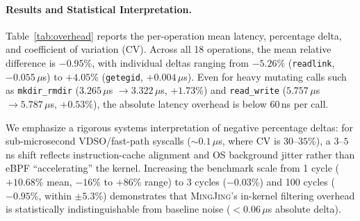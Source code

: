 \documentclass[10pt,twocolumn,letterpaper]{article}
\newcommand{\sys}{\textsc{MingJing}}
\newcommand{\code}[1]{\texttt{\small #1}}
\begin{document}
\paragraph{Results and Statistical Interpretation.} Table~\ref{tab:overhead} reports the per-operation mean latency, percentage delta, and coefficient of variation (CV). Across all 18 operations, the mean relative difference is $-0.95\%$, with individual deltas ranging from $-5.26\%$ (\code{readlink}, $-0.055\,\mu$s) to $+4.05\%$ (\code{getegid}, $+0.004\,\mu$s). Even for heavy mutating calls such as \code{mkdir\_rmdir} ($3.265\,\mu$s $\to 3.322\,\mu$s, $+1.73\%$) and \code{read\_write} ($5.757\,\mu$s $\to 5.787\,\mu$s, $+0.53\%$), the absolute latency overhead is below $60\,$ns per call.

We emphasize a rigorous systems interpretation of negative percentage deltas: for sub-microsecond VDSO/fast-path syscalls ($\sim 0.1\,\mu$s, where CV is $30\text{--}35\%$), a $3\text{--}5\,$ns shift reflects instruction-cache alignment and OS background jitter rather than eBPF ``accelerating'' the kernel. Increasing the benchmark scale from 1 cycle ($+10.68\%$ mean, $-16\%$ to $+86\%$ range) to 3 cycles ($-0.03\%$) and 100 cycles ($-0.95\%$, within $\pm 5.3\%$) demonstrates that \sys{}'s in-kernel filtering overhead is statistically indistinguishable from baseline noise ($<0.06\,\mu$s absolute delta).
\end{document}
